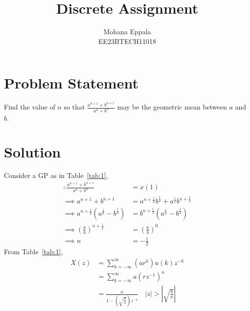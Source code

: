\documentclass[12pt]{article}
\newcommand{\tabref}[1]{Table~\ref{#1}}
\providecommand{\abs}[1]{\left\vert#1\right\vert}
\begin{document}
\title{Discrete Assignment}
\author{Mohana Eppala\\ EE23BTECH11018}
\maketitle

\section*{Problem Statement}
Find the value of $n$ so that $\frac{a^{n+1} + b^{n+1}}{a^{n}+b^{n}}$ may be the geometric mean between $a$ and $b$.
\section{Solution}

\begin{table}[H]

\end{table}

Consider a GP as in \tabref{tab:1},
\begin{align}
	\therefore \frac{a^{n+1} + b^{n+1}}{a^{n}+b^{n}} &= x(1) \\
	\implies a^{n+1} + b^{n+1} &= a^{n+\frac{1}{2}}b^{\frac{1}{2}} + a^{\frac{1}{2}}b^{n+\frac{1}{2}} \\
\implies a^{n+\frac{1}{2}}(a^{\frac{1}{2}} - b^{\frac{1}{2}}) &= b^{n+\frac{1}{2}}(a^{\frac{1}{2}} - b^{\frac{1}{2}}) \\
\implies (\frac{a}{b})^{n+\frac{1}{2}} &= (\frac{a}{b})^{0} \\
\implies n &= -\frac{1}{2}
\end{align}
From \tabref{tab:1},
\begin{align}
	X(z) &= \sum_{k=-\infty}^{\infty} (ar^{k})u(k)z^{-k} \\
	&= \sum_{k=-\infty}^{\infty}a(rz^{-1})^{n} \\
	&= \frac{a}{1-(\sqrt{\frac{b}{a}})z^{-1}} \quad \abs{z}>\abs{\sqrt{\frac{b}{a}}}
\end{align}
\end{document}

